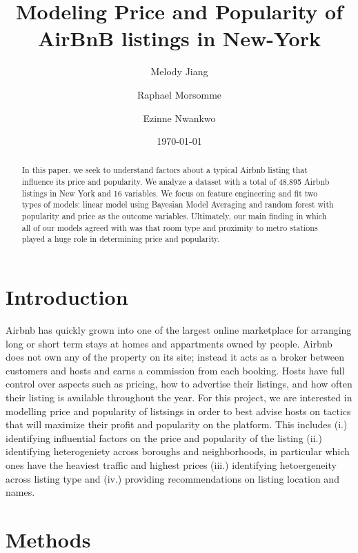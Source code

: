 \documentclass[10pt]{jmlr}%
\title[Modeling Price and Popularity of AirBnB listings in New-York]{Modeling Price and Popularity of AirBnB listings in New-York}	%
\author[Jiang, Morsomme, Nwankwo]{Melody Jiang \and Raphael Morsomme \and Ezinne Nwankwo}
\date{\today} %
\begin{document}
\maketitle

\begin{abstract}
In this paper, we seek to understand factors about a typical Airbnb listing that influence its price and popularity. We analyze a dataset with a total of 48,895 Airbnb listings in New York and 16 variables. We focus on feature engineering and fit two types of models: linear model using Bayesian Model Averaging and random forest with popularity and price as the outcome variables. Ultimately, our main finding in which all of our models agreed with was that room type and proximity to metro stations played a huge role in determining price and popularity. 
\end{abstract}

\section{Introduction}
\label{sec:intro}

Airbnb has quickly grown into one of the largest online marketplace for arranging long or short term stays at homes and appartments owned by people. Airbnb does not own any of the property on its site; instead it acts as a broker between customers and hosts and earns a commission from each booking. Hosts have full control over aspects such as pricing, how to advertise their listings, and how often their listing is available throughout the year. For this project, we are interested in modelling price and popularity of listsings in order to best advise hosts on tactics that will maximize their profit and popularity on the platform. This includes (i.) identifying influential factors on the price and popularity of the listing (ii.) identifying heterogeniety across boroughs and neighborhoods, in particular which ones have the heaviest traffic and highest prices (iii.) identifying hetoergeneity across listing type and (iv.) providing recommendations on listing location and names. 


\section{Methods}
\label{sec:method}
\end{document}
